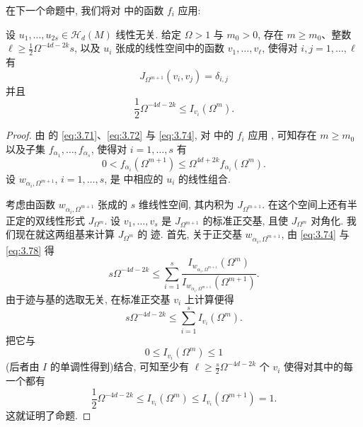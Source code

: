 在下一个命题中, 我们将对 中的函数 $f_i$ 应用:

\begin{proposition}
\label{prop:3.22}
设 $u_1,\dots,u_{2s}\in\mathcal{H}_d(M)$ 线性无关. 给定 $\Omega>1$ 与
$m_0>0$, 存在 $m\geq m_0$、整数
$\ell\geq\frac12\Omega^{-4d-2k}s$, 以及 $u_i$ 张成的线性空间中的函数
$v_1,\dots,v_\ell$, 使得对 $i,j=1,\dots,\ell$ 有
\begin{equation}
J_{\Omega^{m+1}}(v_i,v_j)=\delta_{i,j}
\label{eq:3.76}
\end{equation}
并且
\begin{equation}
\frac12\Omega^{-4d-2k}\leq I_{v_i}(\Omega^m).
\label{eq:3.77}
\end{equation}
\end{proposition}

\begin{proof}
由 的 \eqref{eq:3.71}、\eqref{eq:3.72} 与 \eqref{eq:3.74}, 对 中的 $f_i$ 应用
, 可知存在 $m\geq m_0$ 以及子集
$f_{\alpha_1},\dots,f_{\alpha_s}$, 使得对 $i=1,\dots,s$ 有
\begin{equation}
0<f_{\alpha_i}(\Omega^{m+1})
 \leq\Omega^{4d+2k}f_{\alpha_i}(\Omega^m).
\label{eq:3.78}
\end{equation}
设 $w_{\alpha_i,\Omega^{m+1}}$, $i=1,\dots,s$, 是 中相应的
$u_i$ 的线性组合.

考虑由函数 $w_{\alpha_i,\Omega^{m+1}}$ 张成的 $s$ 维线性空间, 其内积为
$J_{\Omega^{m+1}}$. 在这个空间上还有半正定的双线性形式
$J_{\Omega^m}$. 设 $v_1,\dots,v_s$ 是 $J_{\Omega^{m+1}}$ 的标准正交基,
且使 $J_{\Omega^m}$ 对角化. 我们现在就这两组基来计算 $J_{\Omega^m}$ 的
迹. 首先, 关于正交基 $w_{\alpha_i,\Omega^{m+1}}$, 由 \eqref{eq:3.74} 与 \eqref{eq:3.78} 得
\begin{equation}
s\Omega^{-4d-2k}\leq\sum_{i=1}^s
 \frac{I_{w_{\alpha_i,\Omega^{m+1}}}(\Omega^m)}
 {I_{w_{\alpha_i,\Omega^{m+1}}}(\Omega^{m+1})}.
\label{eq:3.79}
\end{equation}
由于迹与基的选取无关, 在标准正交基 $v_i$ 上计算便得
\begin{equation}
s\Omega^{-4d-2k}\leq\sum_{i=1}^sI_{v_i}(\Omega^m).
\label{eq:3.80}
\end{equation}
把它与
\begin{equation}
0\leq I_{v_i}(\Omega^m)\leq1
\label{eq:3.81}
\end{equation}
(后者由 $I$ 的单调性得到)结合, 可知至少有
$\ell\geq\frac s2\Omega^{-4d-2k}$ 个 $v_i$ 使得对其中的每一个都有
\begin{equation}
\frac12\Omega^{-4d-2k}\leq I_{v_i}(\Omega^m)
 \leq I_{v_i}(\Omega^{m+1})=1.
\label{eq:3.82}
\end{equation}
这就证明了命题.
\end{proof}

